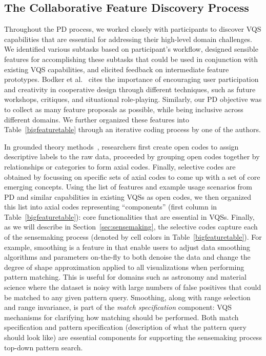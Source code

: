 {  \subsection{The Collaborative Feature Discovery Process}
  \par Throughout the PD process, we worked closely with participants to discover VQS capabilities that are essential for addressing their high-level domain challenges. We identified various subtasks based on participant's workflow, designed sensible features for accomplishing these subtasks that could be used in conjunction with existing VQS capabilities, and elicited feedback on intermediate feature prototypes. Bodker et al.~\cite{BodkerGronbaek} cites the importance of encouraging user participation and creativity in cooperative design through different techniques, such as future workshops, critiques, and situational role-playing. Similarly, our PD objective was to collect as many feature proposals as possible, while being inclusive across different domains. We further organized these features into Table~\ref{bigfeaturetable} through an iterative coding process by one of the authors.
  \par In grounded theory methods~\cite{Muller2012}, researchers first create open codes to assign descriptive labels to the raw data, proceeded by grouping open codes together by relationships or categories to form axial codes. Finally, selective codes are obtained by focussing on specific sets of axial codes to come up with a set of core emerging concepts. Using the list of features and example usage scenarios from PD and similar capabilities in existing VQSs as open codes, we then organized this list into axial codes representing ``components'' (first column in Table~\ref{bigfeaturetable}): core functionalities that are essential in VQSs. Finally, as we will describe in Section~\ref{sec:sensemaking}, the selective codes capture each of the sensemaking process (denoted by cell colors in Table~\ref{bigfeaturetable}). For example, smoothing is a feature in \zvpp that enable users to adjust data smoothing algorithms and parameters on-the-fly to both denoise the data and change the degree of shape approximation applied to all visualizations when performing pattern matching. This is useful for domains such as astronomy and material science where the dataset is noisy with large numbers of false positives that could be matched to any given pattern query. Smoothing, along with range selection and range invariance, is part of the \emph{match specification} component: VQS mechanisms for clarifying how matching should be performed. Both match specification and pattern specification (description of what the pattern query should look like) are essential components for supporting the sensemaking process top-down pattern search.
}
